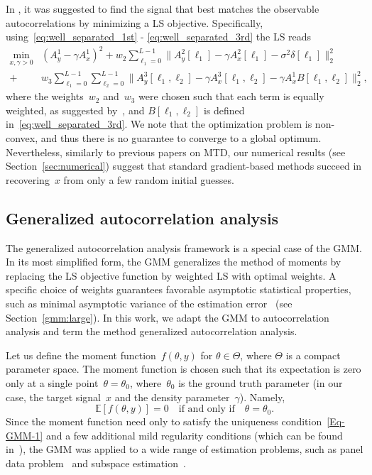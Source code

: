 \documentclass{article}
\newcommand{\E}[0]{\mathbb{E}}
\newcommand{\R}[0]{\mathbb{R}}
\begin{document}
In \cite{bendory2019multi,lan2020multi,marshall2020image,bendory2021multi,kreymer2021two}, it was suggested to find the signal that best matches the observable autocorrelations by minimizing a LS objective. Specifically, using~\eqref{eq:well_separated_1st} - \eqref{eq:well_separated_3rd} the LS reads
\begin{align}
\label{eq:optimization}
\min_{x, \gamma > 0} & (A_y^1 - \gamma A_x^1)^2  + w_2 \sum_{\ell_1 = 0}^{L - 1} \|A_y^2[\ell_1] - \gamma A_x^2[\ell_1] - \sigma^2 \delta[\ell_1]\|_2^2\nonumber\\ +& w_3 \sum_{\ell_1 = 0}^{L - 1} \sum_{\ell_2 = 0}^{L - 1} \|A_y^3[\ell_1, \ell_2] - \gamma A_x^3[\ell_1, \ell_2] - \gamma A_{x}^1 B[\ell_1, \ell_2]\|_2^2,
\end{align}
where the weights~$w_2$ and~$w_3$ were chosen such that each term is equally weighted, as suggested by~\cite{bendory2019multi}, and $B[\ell_1, \ell_2]$ is defined in~\eqref{eq:well_separated_3rd}. We note that the optimization problem is non-convex, and thus there is no guarantee to converge to a global optimum. Nevertheless, similarly to previous papers on MTD, our numerical results (see Section~\ref{sec:numerical}) suggest that standard gradient-based methods succeed in recovering~$x$ from only a few random initial guesses.

\subsection{Generalized autocorrelation analysis}
\label{subsec:generalized_ac}
The generalized autocorrelation analysis framework is a special case of the GMM.  In its most simplified form, the GMM generalizes the method of moments by replacing the LS objective function by  weighted LS with  optimal weights. A specific  choice of weights guarantees favorable asymptotic statistical properties, such as  minimal asymptotic variance of the estimation error~\cite{Hansen1982} {(see Section~\ref{gmm:large})}. In this work, we adapt the GMM to autocorrelation analysis and term the method generalized autocorrelation analysis.

Let us define the moment function~$f(\theta, y)$  for $\theta\in\Theta$, where $\Theta$ is a compact parameter space.
 The moment function is chosen such that its expectation is zero only at a single point~$\theta=\theta_0$, where~$\theta_0$ is the ground truth parameter (in our case, the target signal~$x$ and the density parameter~$\gamma$). Namely,
\begin{equation}\label{Eq-GMM-1}
	\E\left[f(\theta,y)\right] = 0 \quad \text{if and only if} \quad \theta = \theta_0.
\end{equation}
Since the moment function need only to satisfy the uniqueness condition~\eqref{Eq-GMM-1} and a few additional mild regularity conditions (which can be found in~\cite{Hansen1982,Hall2005,abas2021generalized}), the GMM was applied to a wide range of estimation problems,  such as panel data problem~\cite{blundell2000gmm} and subspace estimation~\cite{fan2018optimal}.
\end{document}
